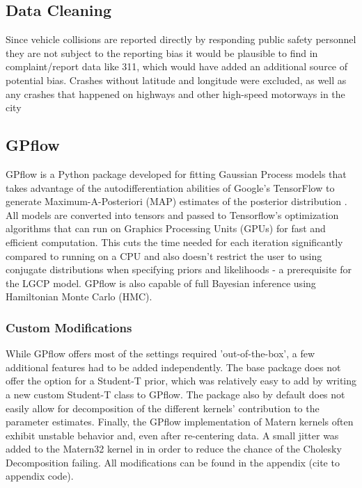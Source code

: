 \subsection{Data Cleaning}

Since vehicle collisions are reported directly by responding public safety personnel they are not subject to the reporting bias it would be plausible to find in complaint/report data like 311, which would have added an additional source of potential bias. Crashes without latitude and longitude were excluded, as well as any crashes that happened on highways and other high-speed motorways in the city

\subsection{GPflow}

GPflow is a Python package developed for fitting Gaussian Process models that takes advantage of the autodifferentiation abilities of Google's TensorFlow to generate Maximum-A-Posteriori (MAP) estimates of the posterior distribution \cite{GPflow2017} \cite{tensorflow2015-whitepaper}. All models are converted into tensors and passed to Tensorflow's optimization algorithms that can run on Graphics Processing Units (GPUs) for fast and efficient computation. This cuts the time needed for each iteration significantly compared to running on a CPU and also doesn't restrict the user to using conjugate distributions when specifying priors and likelihoods - a prerequisite for the LGCP model. GPflow is also capable of full Bayesian inference using Hamiltonian Monte Carlo (HMC).

\subsubsection{Custom Modifications}

While GPflow offers most of the settings required 'out-of-the-box', a few additional features had to be added independently. The base package does not offer the option for a Student-T prior, which was relatively easy to add by writing a new custom Student-T class to GPflow. The package also by default does not easily allow for decomposition of the different kernels' contribution to the parameter estimates. Finally, the GPflow implementation of Matern kernels often exhibit unstable behavior and, even after re-centering data. A small jitter was added to the Matern32 kernel in in order to reduce the chance of the Cholesky Decomposition failing. All modifications can be found in the appendix \todo(cite to appendix code).
